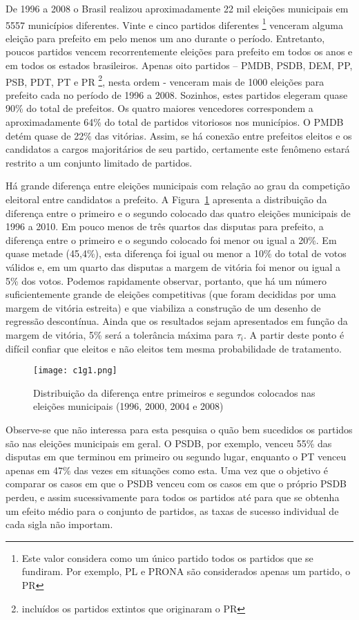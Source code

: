 De 1996 a 2008 o Brasil realizou aproximadamente 22 mil eleições municipais em 5557 municípios diferentes. Vinte e cinco partidos diferentes \footnote{Este valor considera como um único partido todos os partidos que se fundiram. Por exemplo, PL e PRONA são considerados apenas um partido, o PR} venceram alguma eleição para prefeito em pelo menos um ano durante o período. Entretanto, poucos partidos vencem recorrentemente eleições para prefeito em todos os anos e em todos os estados brasileiros. Apenas oito partidos -- PMDB, PSDB, DEM, PP, PSB, PDT, PT e PR \footnote{incluídos os partidos extintos que originaram o PR}, nesta ordem - venceram mais de 1000 eleições para prefeito cada no período de 1996 a 2008. Sozinhos, estes partidos elegeram quase 90\% do total de prefeitos. Os quatro maiores vencedores correspondem a aproximadamente 64\% do total de partidos vitoriosos nos municípios. O PMDB detém quase de 22\% das vitórias. Assim, se há conexão entre prefeitos eleitos e os candidatos a cargos majoritários de seu partido, certamente este fenômeno estará restrito a um conjunto limitado de partidos.

Há grande diferença entre eleições municipais com relação ao grau da competição eleitoral entre candidatos a prefeito. A Figura~\ref{fig:c1g1} apresenta a distribuição da diferença entre o primeiro e o segundo colocado das quatro eleições municipais de 1996 a 2010. Em pouco menos de três quartos das disputas para prefeito, a diferença entre o primeiro e o segundo colocado foi menor ou igual a 20\%. Em quase metade (45,4\%), esta diferença foi igual ou menor a 10\% do total de votos válidos e, em um quarto das disputas a margem de vitória foi menor ou igual a 5\% dos votos. Podemos rapidamente observar, portanto, que há um número suficientemente grande de eleições competitivas (que foram decididas por uma margem de vitória estreita) e que viabiliza a construção de um desenho de regressão descontínua. Ainda que os resultados sejam apresentados em função da margem de vitória, 5\% será a tolerância máxima para $\tau_{i}$. A partir deste ponto é difícil confiar que eleitos e não eleitos tem mesma probabilidade de tratamento.

\begin{figure}[htp]
	\centering
	\texttt{[image: c1g1.png]}
	\caption{Distribuição da diferença entre primeiros e segundos colocados nas eleições municipais (1996, 2000, 2004 e 2008)}
	\label{fig:c1g1} 
\end{figure}

Observe-se que não interessa para esta pesquisa o quão bem sucedidos os partidos são nas eleições municipais em geral. O PSDB, por exemplo, venceu 55\% das disputas em que terminou em primeiro ou segundo lugar, enquanto o PT venceu apenas em 47\% das vezes em situações como esta. Uma vez que o objetivo é comparar os casos em que o PSDB venceu com os casos em que o próprio PSDB perdeu, e assim sucessivamente para todos os partidos até para que se obtenha um efeito médio para o conjunto de partidos, as taxas de sucesso individual de cada sigla não importam.

